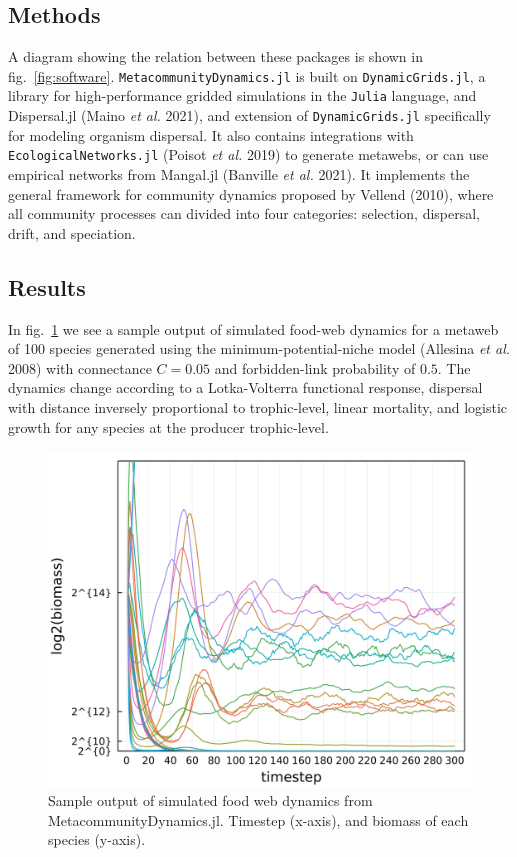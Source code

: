 \documentclass[11pt]{article}
\makeatletter
\def\maxwidth{\ifdim\Gin@nat@width>\linewidth\linewidth
\else\Gin@nat@width\fi}
\let\Oldincludegraphics\includegraphics
\renewcommand{\includegraphics}[1]{\Oldincludegraphics[width=\maxwidth]{#1}}
\makeatother
\begin{document}
\hypertarget{methods-3}{%
\subsection{Methods}\label{methods-3}}

A diagram showing the relation between these packages is shown in
fig.~\ref{fig:software}. \texttt{MetacommunityDynamics.jl} is built on
\texttt{DynamicGrids.jl}, a library for high-performance gridded
simulations in the \texttt{Julia} language, and Dispersal.jl (Maino
\emph{et al.} 2021), and extension of \texttt{DynamicGrids.jl}
specifically for modeling organism dispersal. It also contains
integrations with \texttt{EcologicalNetworks.jl} (Poisot \emph{et al.}
2019) to generate metawebs, or can use empirical networks from Mangal.jl
(Banville \emph{et al.} 2021). It implements the general framework for
community dynamics proposed by Vellend (2010), where all community
processes can divided into four categories: selection, dispersal, drift,
and speciation.

\hypertarget{results-2}{%
\subsection{Results}\label{results-2}}

In fig.~\ref{fig:foodwebtraj} we see a sample output of simulated
food-web dynamics for a metaweb of 100 species generated using the
minimum-potential-niche model (Allesina \emph{et al.} 2008) with
connectance \(C=0.05\) and forbidden-link probability of \(0.5\). The
dynamics change according to a Lotka-Volterra functional response,
dispersal with distance inversely proportional to trophic-level, linear
mortality, and logistic growth for any species at the producer
trophic-level.

\begin{figure}
\hypertarget{fig:foodwebtraj}{%
\centering
\includegraphics{./figures/foodwebtraj.png}
\caption{Sample output of simulated food web dynamics from
MetacommunityDynamics.jl. Timestep (x-axis), and biomass of each species
(y-axis).}\label{fig:foodwebtraj}
}
\end{figure}
\end{document}
